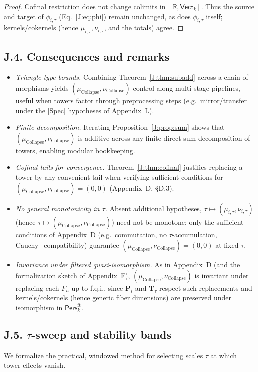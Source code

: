 \documentclass[11pt]{article}
\newcommand{\Pers}{\mathsf{Pers}}
\numberwithin{equation}{section}
\theoremstyle{definition}
\DeclareRobustCommand{\muc}{\mu_{\mathrm{Collapse}}}
\DeclareRobustCommand{\nuc}{\nu_{\mathrm{Collapse}}}
\begin{document}
\begin{proof}
Cofinal restriction does not change colimits in \([\mathbb{R},\mathsf{Vect}_k]\).
Thus the source and target of \(\phi_{i,\tau}\) (Eq.~\eqref{J:eq:phi}) remain unchanged, as does \(\phi_{i,\tau}\) itself; kernels/cokernels (hence \(\mu_{i,\tau},\nu_{i,\tau}\), and the totals) agree.
\end{proof}

\subsection*{J.4. Consequences and remarks}
\begin{itemize}\itemsep0.25em
  \item \emph{Triangle-type bounds.} Combining Theorem~\ref{J:thm:subadd} across a chain of morphisms yields \((\muc,\nuc)\)-control along multi-stage pipelines, useful when towers factor through preprocessing steps (e.g.\ mirror/transfer under the [Spec] hypotheses of Appendix~L).
  \item \emph{Finite decomposition.} Iterating Proposition~\ref{J:prop:sum} shows that \((\muc,\nuc)\) is additive across any finite direct-sum decomposition of towers, enabling modular bookkeeping.
  \item \emph{Cofinal tails for convergence.} Theorem~\ref{J:thm:cofinal} justifies replacing a tower by any convenient tail when verifying sufficient conditions for \((\muc,\nuc)=(0,0)\) (Appendix~D, §D.3).
  \item \emph{No general monotonicity in \(\tau\).} Absent additional hypotheses, \(\tau\mapsto(\mu_{i,\tau},\nu_{i,\tau})\) (hence \(\tau\mapsto(\muc,\nuc)\)) need not be monotone; only the sufficient conditions of Appendix~D (e.g.\ commutation, no \(\tau\)-accumulation, Cauchy+compatibility) guarantee \((\muc,\nuc)=(0,0)\) at fixed \(\tau\).
  \item \emph{Invariance under filtered quasi-isomorphism.} As in Appendix~D (and the formalization sketch of Appendix~F), \((\muc,\nuc)\) is invariant under replacing each \(F_n\) up to f.q.i., since \(\mathbf{P}_i\) and \(\mathbf{T}_\tau\) respect such replacements and kernels/cokernels (hence generic fiber dimensions) are preserved under isomorphism in \(\Pers^{\mathrm{ft}}_k\).
\end{itemize}

\subsection*{J.5. $\tau$-sweep and stability bands}
We formalize the practical, windowed method for selecting scales \(\tau\) at which tower effects vanish.
\end{document}
